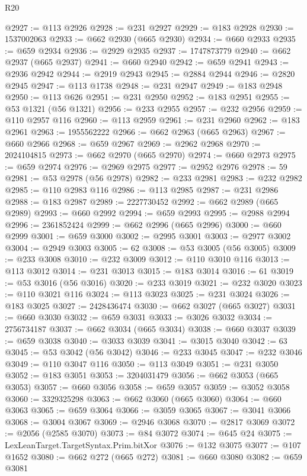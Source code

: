 \begin{lexlean}{R20}
\begin{coremodule}
@2927 := @113 @2926
@2928 := @231 @2927
@2929 := @183 @2928
@2930 := 1537002063
@2933 := @662 @2930 (@665 @2930)
@2934 := @660 @2933
@2935 := @659 @2934
@2936 := @2929 @2935
@2937 := 1747873779
@2940 := @662 @2937 (@665 @2937)
@2941 := @660 @2940
@2942 := @659 @2941
@2943 := @2936 @2942
@2944 := @2919 @2943
@2945 := @2884 @2944
@2946 := @2820 @2945
@2947 := @113 @1738
@2948 := @231 @2947
@2949 := @183 @2948
@2950 := @113 @626
@2951 := @231 @2950
@2952 := @183 @2951
@2955 := @53 @1321 (@56 @1321)
@2956 := @233 @2955
@2957 := @232 @2956
@2959 := @110 @2957 @116
@2960 := @113 @2959
@2961 := @231 @2960
@2962 := @183 @2961
@2963 := 1955562222
@2966 := @662 @2963 (@665 @2963)
@2967 := @660 @2966
@2968 := @659 @2967
@2969 := @2962 @2968
@2970 := 2024104815
@2973 := @662 @2970 (@665 @2970)
@2974 := @660 @2973
@2975 := @659 @2974
@2976 := @2969 @2975
@2977 := @2952 @2976
@2978 := 59
@2981 := @53 @2978 (@56 @2978)
@2982 := @233 @2981
@2983 := @232 @2982
@2985 := @110 @2983 @116
@2986 := @113 @2985
@2987 := @231 @2986
@2988 := @183 @2987
@2989 := 2227730452
@2992 := @662 @2989 (@665 @2989)
@2993 := @660 @2992
@2994 := @659 @2993
@2995 := @2988 @2994
@2996 := 2361852424
@2999 := @662 @2996 (@665 @2996)
@3000 := @660 @2999
@3001 := @659 @3000
@3002 := @2995 @3001
@3003 := @2977 @3002
@3004 := @2949 @3003
@3005 := 62
@3008 := @53 @3005 (@56 @3005)
@3009 := @233 @3008
@3010 := @232 @3009
@3012 := @110 @3010 @116
@3013 := @113 @3012
@3014 := @231 @3013
@3015 := @183 @3014
@3016 := 61
@3019 := @53 @3016 (@56 @3016)
@3020 := @233 @3019
@3021 := @232 @3020
@3023 := @110 @3021 @116
@3024 := @113 @3023
@3025 := @231 @3024
@3026 := @183 @3025
@3027 := 2428436474
@3030 := @662 @3027 (@665 @3027)
@3031 := @660 @3030
@3032 := @659 @3031
@3033 := @3026 @3032
@3034 := 2756734187
@3037 := @662 @3034 (@665 @3034)
@3038 := @660 @3037
@3039 := @659 @3038
@3040 := @3033 @3039
@3041 := @3015 @3040
@3042 := 63
@3045 := @53 @3042 (@56 @3042)
@3046 := @233 @3045
@3047 := @232 @3046
@3049 := @110 @3047 @116
@3050 := @113 @3049
@3051 := @231 @3050
@3052 := @183 @3051
@3053 := 3204031479
@3056 := @662 @3053 (@665 @3053)
@3057 := @660 @3056
@3058 := @659 @3057
@3059 := @3052 @3058
@3060 := 3329325298
@3063 := @662 @3060 (@665 @3060)
@3064 := @660 @3063
@3065 := @659 @3064
@3066 := @3059 @3065
@3067 := @3041 @3066
@3068 := @3004 @3067
@3069 := @2946 @3068
@3070 := @2817 @3069
@3072 := @2056 (@2585 @3070)
@3073 := @84 @3072
@3074 := @645 @24
@3075 := LexLeanTarget.TargetSyntax.Prim.bitXor
@3076 := @132 @3075
@3077 := @107 @1652
@3080 := @662 @272 (@665 @272)
@3081 := @660 @3080
@3082 := @659 @3081

\end{coremodule}
\end{lexlean}
